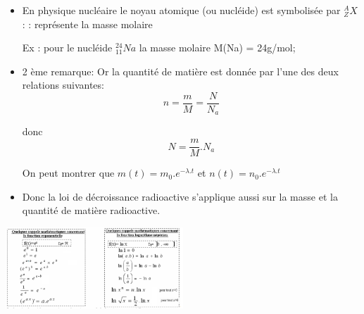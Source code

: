 \documentclass[12pt]{article}
\begin{document}
\begin{itemize}

	\item En physique nucléaire le noyau atomique (ou nucléide) est symbolisée par $_Z^AX$ : 
: représente la masse molaire

Ex : pour le nucléide $_{11}^{24}Na$ la masse molaire M(Na) = 24g/mol;

\item 2 ème remarque:
	Or la quantité de matière est donnée par l'une des deux relations suivantes:
	$$n = \frac{m}{M} = \frac{N}{N_a}$$

	donc $$N=\frac{m}{M}.N_a$$

	On peut montrer que $m(t) = m_0.e^{-\lambda.t}$ et $n(t) = n_0.e^{-\lambda.t}$

\item Donc la loi de décroissance radioactive s'applique aussi sur la masse et la quantité de matière radioactive. 





\end{itemize}


\begin{center}

	\includegraphics[width=0.5\textwidth]{./img/ex09.png}
\end{center}




\end{document}
